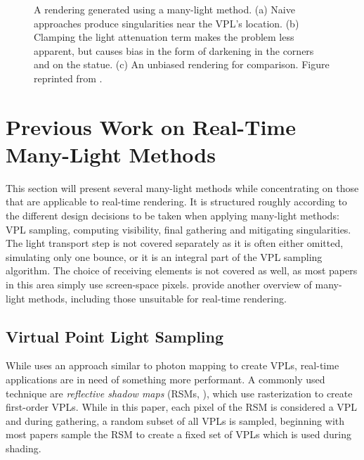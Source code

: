 \begin{figure}[htb]
\begin{subfigure}[b]{0.32\textwidth}
        \caption{}
    \end{subfigure}%
    \caption{A rendering generated using a many-light method. (a) Naive approaches produce singularities near the VPL's location. (b) Clamping the light attenuation term makes the problem less apparent, but causes bias in the form of darkening in the corners and on the statue. (c) An unbiased rendering for comparison. Figure reprinted from \citet{Dachsbacher:2014:ManyLightsSTAR}.}
    \label{fig:introGI:clamping}%
\end{figure}%



\section{Previous Work on Real-Time Many-Light Methods}
\label{sec:intro:relatedWorkManyLight}

This section will present several many-light methods while concentrating on those that are applicable to real-time rendering. It is structured roughly according to the different design decisions to be taken when applying many-light methods: VPL sampling, computing visibility, final gathering and mitigating singularities. The light transport step is not covered separately as it is often either omitted, simulating only one bounce, or it is an integral part of the VPL sampling algorithm. The choice of receiving elements is not covered as well, as most papers in this area simply use screen-space pixels. \citet{Dachsbacher:2014:ManyLightsSTAR} provide another overview of many-light methods, including those unsuitable for real-time rendering.


\subsection{Virtual Point Light Sampling}
\label{sec:intro:relatedWorkManyLight:vplSampling}

While \citet{Keller:1997:InstantRadiosity} uses an approach similar to photon mapping to create VPLs, real-time applications are in need of something more performant. A commonly used technique are \emph{reflective shadow maps} (RSMs, \cite{Dachsbacher:2005:RSM}), which use rasterization to create first-order VPLs. While in this paper, each pixel of the RSM is considered a VPL and during gathering, a random subset of all VPLs is sampled, beginning with \citet{dachsbacher2006splatting} most papers sample the RSM to create a fixed set of VPLs which is used during shading.

